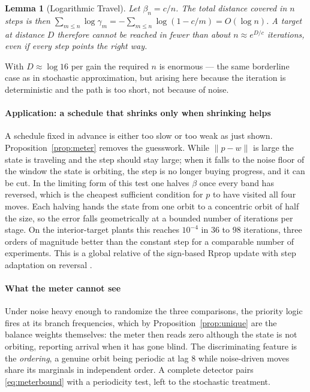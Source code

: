\documentclass[letterpaper, 10pt, conference, twocolumn]{ieeeconf}
\newtheorem{lemma}{Lemma}
\begin{document}
\begin{lemma}[Logarithmic Travel]
\label{lem:travel}
Let $\beta_n = c/n$. The total distance covered in $n$ steps is then
$\sum_{m \le n} \log\gamma_m = -\sum_{m \le n}\log(1 - c/m) = O(\log n)$.
A target at distance $D$ therefore cannot be reached in fewer than about
$n \approx e^{D/c}$ iterations, even if every step points the right way.
\end{lemma}

With $D \approx \log 16$ per gain the required $n$ is enormous --- the same
borderline case as in stochastic approximation, but arising here because the
iteration is deterministic and the path is too short, not because of noise.



\paragraph{Application: a schedule that shrinks only when shrinking helps}
A schedule fixed in advance is either too slow or too weak
as just shown. Proposition~\ref{prop:meter} removes the guesswork.
While $\lVert p - w \rVert$ is large the state is traveling and the step should
stay large; when it falls to the noise floor of the window the state is
orbiting, the step is no longer buying progress, and it can be cut. In the
limiting form of this test one halves $\beta$ once every band has reversed,
which is the cheapest sufficient condition for $p$ to have visited all four
moves. Each halving hands the state from one orbit to a concentric orbit of
half the size, so the error falls geometrically at a bounded number of iterations
per stage. On the interior-target plants this reaches $10^{-4}$ in $36$ to
$98$ iterations, three orders of magnitude better than the constant step for a
comparable number of experiments. This is a global relative of the sign-based Rprop
update with step adaptation on reversal \cite{Riedmiller1993}.

\paragraph{What the meter cannot see} Under noise heavy enough to randomize the
three comparisons, the priority logic fires at its branch frequencies, which by
Proposition~\ref{prop:unique} are the balance weights themselves: the meter
then reads zero although the state is not orbiting, reporting arrival when it
has gone blind. The discriminating feature is the \emph{ordering}, a genuine
orbit being periodic at lag $8$ while noise-driven moves share its marginals in
independent order. A complete detector pairs \eqref{eq:meterbound} with a
periodicity test, left to the stochastic treatment.
\end{document}
